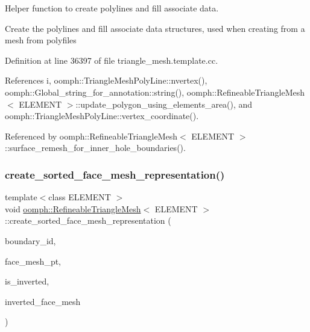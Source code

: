 Helper function to create polylines and fill associate data. 

Create the polylines and fill associate data structures, used when creating from a mesh from polyfiles 

Definition at line 36397 of file triangle\+\_\+mesh.\+template.\+cc.



References i, oomph\+::\+Triangle\+Mesh\+Poly\+Line\+::nvertex(), oomph\+::\+Global\+\_\+string\+\_\+for\+\_\+annotation\+::string(), oomph\+::\+Refineable\+Triangle\+Mesh$<$ E\+L\+E\+M\+E\+N\+T $>$\+::update\+\_\+polygon\+\_\+using\+\_\+elements\+\_\+area(), and oomph\+::\+Triangle\+Mesh\+Poly\+Line\+::vertex\+\_\+coordinate().



Referenced by oomph\+::\+Refineable\+Triangle\+Mesh$<$ E\+L\+E\+M\+E\+N\+T $>$\+::surface\+\_\+remesh\+\_\+for\+\_\+inner\+\_\+hole\+\_\+boundaries().

\mbox{\label{classoomph_1_1RefineableTriangleMesh_a8ad12ebe7625ff189c1f7beb1eabff04}} 
\subsubsection{\texorpdfstring{create\+\_\+sorted\+\_\+face\+\_\+mesh\+\_\+representation()}{create\_sorted\_face\_mesh\_representation()}}
{\footnotesize\ttfamily template$<$class E\+L\+E\+M\+E\+NT $>$ \\
void \hyperlink{classoomph_1_1RefineableTriangleMesh}{oomph\+::\+Refineable\+Triangle\+Mesh}$<$ E\+L\+E\+M\+E\+NT $>$\+::create\+\_\+sorted\+\_\+face\+\_\+mesh\+\_\+representation (\begin{DoxyParamCaption}\item[{const unsigned \&}]{boundary\+\_\+id,  }\item[{\hyperlink{classoomph_1_1Mesh}{Mesh} $\ast$}]{face\+\_\+mesh\+\_\+pt,  }\item[{std\+::map$<$ \hyperlink{classoomph_1_1FiniteElement}{Finite\+Element} $\ast$, bool $>$ \&}]{is\+\_\+inverted,  }\item[{bool \&}]{inverted\+\_\+face\+\_\+mesh }\end{DoxyParamCaption})\hspace{0.3cm}{\ttfamily [protected]}}



